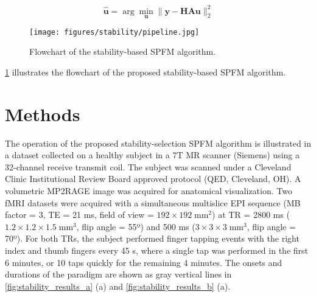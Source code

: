 \begin{equation}
    \mathbf{\hat{u}} = \arg \min_{\mathbf{u}} \|\mathbf{y} - \mathbf{HAu}\|_2^2
    \label{eq:stability_debiasing_innovation}
\end{equation}

\begin{figure}[!ht]
    \centering
    \texttt{[image: figures/stability/pipeline.jpg]}
    \caption{Flowchart of the stability-based SPFM algorithm.}
    \label{fig:stability_flowchart}
\end{figure}

\cref{fig:stability_flowchart} illustrates the flowchart of the proposed stability-based SPFM algorithm.

\section{Methods}
\label{sec:stability_methods}

The operation of the proposed stability-selection SPFM algorithm is illustrated
in a dataset collected on a healthy subject in a 7T MR scanner (Siemens) using a
32-channel receive transmit coil. The subject was scanned under a Cleveland
Clinic Institutional Review Board approved protocol (QED, Cleveland, OH). A
volumetric MP2RAGE image was acquired for anatomical visualization. Two fMRI
datasets were acquired with a simultaneous multislice EPI sequence (MB factor =
3, TE = 21 ms, field of view = $192 \times 192 \; \text{mm}^2$) at TR = 2800 ms
($1.2 \times 1.2 \times 1.5 \; \text{mm}^3$, flip angle = 55º) and 500 ms ($3
\times 3 \times 3 \; \text{mm}^3$, flip angle = 70º). For both TRs, the subject
performed finger tapping events with the right index and thumb fingers every 45
s, where a single tap was performed in the first 6 minutes, or 10 taps quickly
for the remaining 4 minutes. The onsets and durations of the paradigm are shown
as gray vertical lines in \cref{fig:stability_results_a} (a) and
\cref{fig:stability_results_b} (a).

